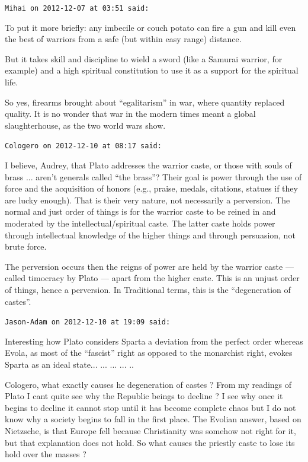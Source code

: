 \begin{footnotesize}
\begin{sffamily}
\texttt{Mihai on 2012-12-07 at 03:51 said:}

To put it more briefly: any imbecile or couch potato can fire a gun and kill even the best of warriors from a safe (but within easy range) distance.

But it takes skill and discipline to wield a sword (like a Samurai warrior, for example) and a high spiritual constitution to use it as a support for the spiritual life.

So yes, firearms brought about ``egalitarism'' in war, where quantity replaced quality. It is no wonder that war in the modern times meant a global slaughterhouse, as the two world wars show.

\hfill

\texttt{Cologero on 2012-12-10 at 08:17 said:}

I believe, Audrey, that Plato addresses the warrior caste, or those with souls of brass ... aren't generals called ``the brass''? Their goal is power through the use of force and the acquisition of honors (e.g., praise, medals, citations, statues if they are lucky enough). That is their very nature, not necessarily a perversion. The normal and just order of things is for the warrior caste to be reined in and moderated by the intellectual/spiritual caste. The latter caste holds power through intellectual knowledge of the higher things and through persuasion, not brute force.

The perversion occurs then the reigns of power are held by the warrior caste --- called timocracy by Plato --- apart from the higher caste. This is an unjust order of things, hence a perversion. In Traditional terms, this is the ``degeneration of castes''.

\hfill

\texttt{Jason-Adam on 2012-12-10 at 19:09 said:}

Interesting how Plato considers Sparta a deviation from the perfect order whereas Evola, as most of the ``fascist'' right as opposed to the monarchist right, evokes Sparta as an ideal state... ... ... ... ..

Cologero, what exactly causes he degeneration of castes ? From my readings of Plato I cant quite see why the Republic beings to decline ? I see why once it begins to decline it cannot stop until it has become complete chaos but I do not know why a society begins to fall in the first place. The Evolian answer, based on Nietzsche, is that Europe fell because Christianity was somehow not right for it, but that explanation does not hold. So what causes the priestly caste to lose its hold over the masses ?


\end{sffamily}
\end{footnotesize}
